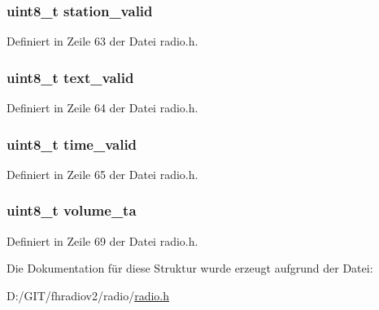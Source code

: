 \subsubsection[{station\+\_\+valid}]{\setlength{\rightskip}{0pt plus 5cm}uint8\+\_\+t station\+\_\+valid}\label{structradio__status_ad84d780e2e45afd62830f27f2d4dbd9a}


Definiert in Zeile 63 der Datei radio.\+h.

\hypertarget{structradio__status_a6a0d33cd9094edee0dad3deb6b386914}{}
\subsubsection[{text\+\_\+valid}]{\setlength{\rightskip}{0pt plus 5cm}uint8\+\_\+t text\+\_\+valid}\label{structradio__status_a6a0d33cd9094edee0dad3deb6b386914}


Definiert in Zeile 64 der Datei radio.\+h.

\hypertarget{structradio__status_a11ae5e5b507c175049a332002aa85849}{}
\subsubsection[{time\+\_\+valid}]{\setlength{\rightskip}{0pt plus 5cm}uint8\+\_\+t time\+\_\+valid}\label{structradio__status_a11ae5e5b507c175049a332002aa85849}


Definiert in Zeile 65 der Datei radio.\+h.

\hypertarget{structradio__status_aa8bc97428a85a9013ed525f6f612a112}{}
\subsubsection[{volume\+\_\+ta}]{\setlength{\rightskip}{0pt plus 5cm}uint8\+\_\+t volume\+\_\+ta}\label{structradio__status_aa8bc97428a85a9013ed525f6f612a112}


Definiert in Zeile 69 der Datei radio.\+h.



Die Dokumentation für diese Struktur wurde erzeugt aufgrund der Datei\+:\begin{DoxyCompactItemize}
\item 
D\+:/\+G\+I\+T/fhradiov2/radio/\hyperlink{radio_8h}{radio.\+h}\end{DoxyCompactItemize}
